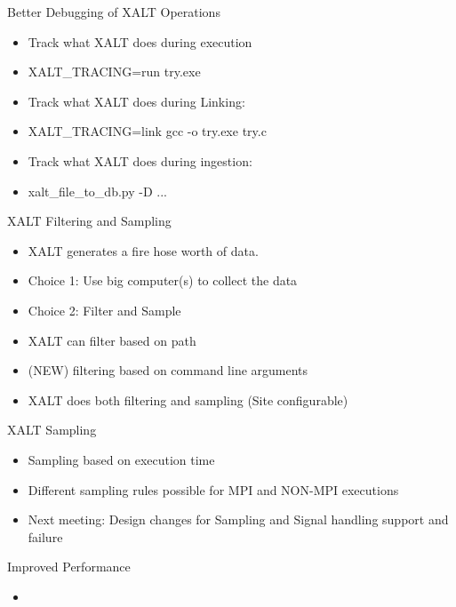 \documentclass{beamer}
\begin{document}
\begin{frame}{Better Debugging of XALT Operations}
  \begin{itemize}
    \item Track what XALT does during execution
    \item XALT_TRACING=run try.exe
    \item Track what XALT does during Linking:
    \item XALT_TRACING=link gcc -o try.exe try.c
    \item Track what XALT does during ingestion:
    \item xalt_file_to_db.py -D ...
  \end{itemize}
\end{frame}

\begin{frame}{XALT Filtering and Sampling}
  \begin{itemize}
    \item XALT generates a fire hose worth of data.
    \item Choice 1: Use big computer(s)  to collect the data
    \item Choice 2: Filter and Sample
    \item XALT can filter based on path
    \item (NEW) filtering based on command line arguments
    \item XALT does both filtering and sampling (Site configurable)
   \end{itemize}
\end{frame}

\begin{frame}{XALT Sampling}
  \begin{itemize}
    \item Sampling based on execution time
    \item Different sampling rules possible for MPI and NON-MPI
      executions
    \item Next meeting: Design changes for Sampling and Signal
      handling support and failure
  \end{itemize}
\end{frame}

\begin{frame}{Improved Performance}
  \begin{itemize}
    \item
  \end{itemize}
\end{frame}
\end{document}
